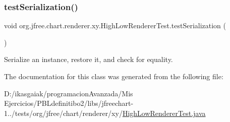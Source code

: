 \subsubsection{\texorpdfstring{test\+Serialization()}{testSerialization()}}
{\footnotesize\ttfamily void org.\+jfree.\+chart.\+renderer.\+xy.\+High\+Low\+Renderer\+Test.\+test\+Serialization (\begin{DoxyParamCaption}{ }\end{DoxyParamCaption})}

Serialize an instance, restore it, and check for equality. 

The documentation for this class was generated from the following file\+:\begin{DoxyCompactItemize}
\item 
D\+:/ikasgaiak/programacion\+Avanzada/\+Mis Ejercicios/\+P\+B\+Ldefinitibo2/libs/jfreechart-\/1../tests/org/jfree/chart/renderer/xy/\mbox{\hyperlink{_high_low_renderer_test_8java}{High\+Low\+Renderer\+Test.\+java}}\end{DoxyCompactItemize}
